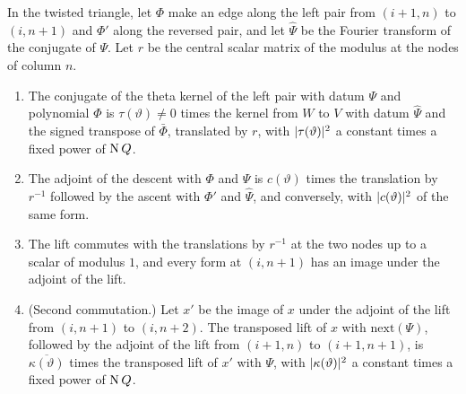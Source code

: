 \begin{lemma}\label{lem:descent-adjoints}
In the twisted triangle, let $\Phi$ make an edge along the left pair from $(i+1,n)$ to $(i,n+1)$ and $\Phi'$ along the reversed pair, and let $\hat\Psi$ be the Fourier transform of the conjugate of $\Psi$. Let $r$ be the
central scalar matrix of the modulus at the nodes of column $n$.
\begin{enumerate}[label=\textup{(\alph*)}]
\item The conjugate of the theta kernel of the left pair with datum $\Psi$ and polynomial $\Phi$ is $\tau(\vartheta)\ne0$ times the kernel from $W$ to $V$ with datum $\hat\Psi$ and the signed transpose of $\bar\Phi$, translated
by $r$, with $\lvert \tau(\vartheta)\rvert^2$ a constant times a fixed power of $\operatorname{N} Q$.
\item The adjoint of the descent with $\Phi$ and $\Psi$ is $c(\vartheta)$ times the translation by $r^{-1}$ followed by the ascent with $\Phi'$ and $\hat\Psi$, and conversely, with $\lvert c(\vartheta)\rvert^2$ of the same form.
\item The lift commutes with the translations by $r^{-1}$ at the two nodes up to a scalar of modulus $1$, and every form at $(i,n+1)$ has an image under the adjoint of the lift.
\item (Second commutation.) Let $x'$ be the image of $x$ under the adjoint of the lift from $(i,n+1)$ to $(i,n+2)$. The transposed lift of $x$ with $\mathrm{next}(\Psi)$, followed by the adjoint of the lift from $(i+1,n)$ to
$(i+1,n+1)$, is $\overline{\kappa(\vartheta)}$ times the transposed lift of $x'$ with $\Psi$, with $\lvert \kappa(\vartheta)\rvert^2$ a constant times a fixed power of $\operatorname{N} Q$.
\end{enumerate}
\end{lemma}

